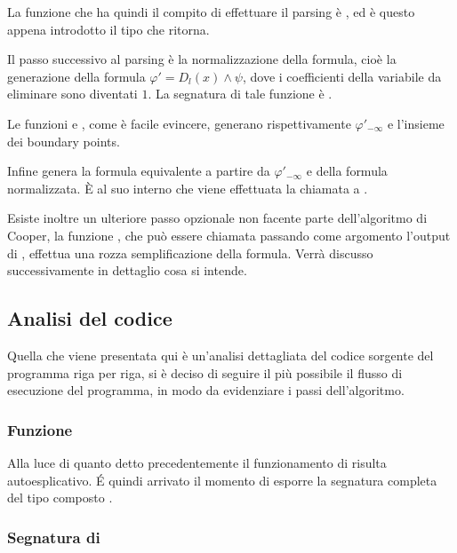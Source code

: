 \documentclass[11pt,letterpaper,twoside]{article}
\begin{document}
La funzione che ha quindi il compito di effettuare il parsing è
, ed è questo appena introdotto il tipo
che ritorna.

Il passo successivo al parsing è la normalizzazione della formula, cioè la generazione
della formula $\varphi' = D_l(x) \land \psi$, dove i coefficienti della variabile
da eliminare sono diventati $1$. La segnatura di tale funzione è .

Le funzioni  e \newline
{}, come è
facile evincere, generano rispettivamente $\varphi' _{- \infty}$ e l'insieme dei
boundary points.

Infine  genera la formula equivalente a partire da
$\varphi '_{- \infty}$ e della formula normalizzata. \`E al suo interno che viene
effettuata la chiamata a .

Esiste inoltre un ulteriore passo opzionale non facente parte dell'algoritmo di
Cooper, la funzione , che può essere
chiamata passando come argomento l'output di , effettua una
rozza semplificazione della formula. Verrà discusso successivamente in dettaglio
cosa si intende. 

\subsection{Analisi del codice}
Quella che viene presentata qui è un'analisi dettagliata del codice sorgente del
programma riga per riga, si è deciso di seguire il più possibile il flusso di
esecuzione del programma, in modo da evidenziare i passi dell'algoritmo.

\subsubsection{Funzione }

Alla luce di quanto detto precedentemente il funzionamento di 
risulta autoesplicativo. \'E quindi arrivato il momento di esporre la segnatura
completa del tipo composto .

\subsubsection{Segnatura di }
\end{document}
